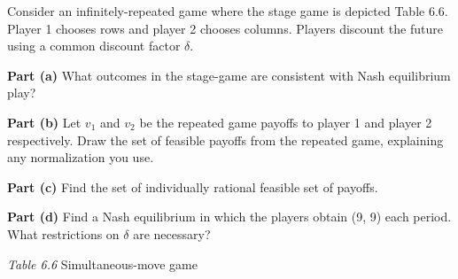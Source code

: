 Consider an infinitely-repeated game where the stage game is depicted Table 6.6. Player 1 chooses
rows and player 2 chooses columns. Players discount the future using a common discount factor
$\delta$.

\textbf{Part (a)} What outcomes in the stage-game are consistent with Nash equilibrium play?

\textbf{Part (b)} Let $v_1$ and $v_2$ be the repeated game payoffs to player 1 and player 2
respectively. Draw the set of feasible payoffs from the repeated game, explaining any normalization
you use.

\textbf{Part (c)} Find the set of individually rational feasible set of payoffs.

\textbf{Part (d)} Find a Nash equilibrium in which the players obtain (9, 9) each period. What
restrictions on $\delta$ are necessary?
\vspace{-6pt}\begin{center}\small\textit{Table 6.6} Simultaneous-move game\end{center}
\resolespaco


